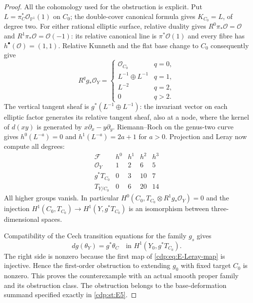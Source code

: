 \begin{proof}
All the cohomology used for the obstruction is explicit. Put
$L=\pi_C^*\mathcal O_{\mathbb P^1}(1)$ on $C_0$; the
double-cover canonical formula gives $K_{C_0}=L$, of degree two.
For either rational elliptic surface, relative duality gives
$R^0\pi_*\mathcal O=\mathcal O$ and
$R^1\pi_*\mathcal O=\mathcal O(-1)$: its relative canonical
line is $\pi^*\mathcal O(1)$ and every fibre has
$h^\bullet(\mathcal O)=(1,1)$. Relative Kunneth and the flat
base change to $C_0$ consequently give
\[
 R^qg_*\mathcal O_Y=
 \begin{cases}
  \mathcal O_{C_0}&q=0,\\
  L^{-1}\oplus L^{-1}&q=1,\\
  L^{-2}&q=2,\\
  0&q>2.
 \end{cases}
\]
The vertical tangent sheaf is $g^*(L^{-1}\oplus L^{-1})$:
the invariant vector on each elliptic factor generates its
relative tangent sheaf, also at a node, where the kernel of
$d(xy)$ is generated by $x\partial_x-y\partial_y$.
Riemann--Roch on the genus-two curve gives
$h^0(L^{-a})=0$ and $h^1(L^{-a})=2a+1$ for $a>0$.
Projection and Leray now compute all degrees:
\[
\begin{array}{c|rrrr}
 \mathcal F&h^0&h^1&h^2&h^3\\\hline
 \mathcal O_Y&1&2&6&5\\
 g^*T_{C_0}&0&3&10&7\\
 T_{Y/C_0}&0&6&20&14
\end{array}
\]
All higher groups vanish. In particular
$H^0(C_0,T_{C_0}\otimes R^1g_*\mathcal O_Y)=0$ and the
injection $H^1(C_0,T_{C_0})\to H^1(Y,g^*T_{C_0})$ is an
isomorphism between three-dimensional spaces.

Compatibility of the Cech transition equations for the family
$g_s$ gives
\[
 dg(\theta_Y)=g^*\theta_C
       \quad\text{in }H^1(Y_0,g^*T_{C_0}).
\]
The right side is nonzero because the first map of
\eqref{cdp:eq:E-Leray-map} is injective. Hence the first-order
obstruction to extending $g_0$ with fixed target $C_0$ is nonzero.
This proves the counterexample with an actual smooth proper
family and its obstruction class. The obstruction belongs to
the base-deformation summand specified exactly in \ref{cdp:st:E5}.
\end{proof}


